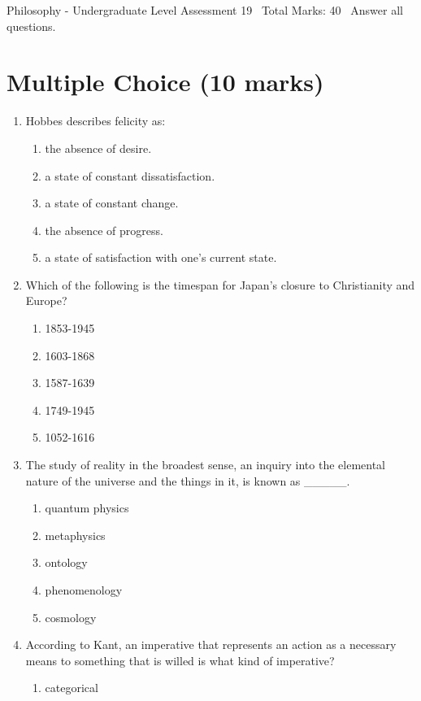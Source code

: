\documentclass[12pt]{article}
\begin{document}
\begin{center}
Philosophy - Undergraduate Level Assessment 19 \
Total Marks: 40 \
Answer all questions.
\end{center}

\section*{Multiple Choice (10 marks)}
\begin{enumerate}[label=\arabic*.]
\item Hobbes describes felicity as:
\begin{enumerate}[label=(\alph*)]
    \item the absence of desire.
    \item a state of constant dissatisfaction.
    \item a state of constant change.
    \item the absence of progress.
    \item a state of satisfaction with one's current state.
\end{enumerate}
\item Which of the following is the timespan for Japan's closure to Christianity and Europe?
\begin{enumerate}[label=(\alph*)]
    \item 1853-1945
    \item 1603-1868
    \item 1587-1639
    \item 1749-1945
    \item 1052-1616
\end{enumerate}
\item The study of reality in the broadest sense, an inquiry into the elemental nature of the universe and the things in it, is known as \_\_\_\_\_.
\begin{enumerate}[label=(\alph*)]
    \item quantum physics
    \item metaphysics
    \item ontology
    \item phenomenology
    \item cosmology
\end{enumerate}
\item According to Kant, an imperative that represents an action as a necessary means to something that is willed is what kind of imperative?
\begin{enumerate}[label=(\alph*)]
    \item categorical

\end{enumerate}
\end{enumerate}
\end{document}
